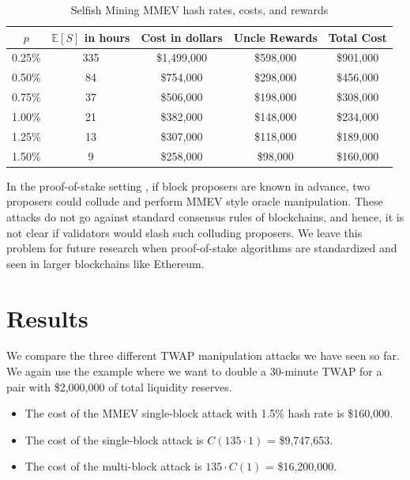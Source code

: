 \documentclass[conference]{IEEEtran}
\begin{document}
\begin{table}[h!]
\begin{center}
 \begin{tabular}{|c |c| c | c | c|} 
 \hline
 $p$ & $\mathbb{E}[S]$ in hours & Cost in dollars & Uncle Rewards & Total Cost\\ [0.5ex] 
 \hline
  0.25\% & 335& \$1,499,000 & \$598,000 &\$901,000\\
  \hline
  0.50\% & 84& \$754,000 & \$298,000 &\$456,000\\
  \hline
  0.75\% & 37& \$506,000 & \$198,000 &\$308,000\\
  \hline
  1.00\% & 21& \$382,000 & \$148,000 &\$234,000\\
  \hline
  1.25\% & 13& \$307,000 & \$118,000 &\$189,000\\
  \hline
  1.50\% & 9& \$258,000 & \$98,000 &\$160,000\\
  \hline
\end{tabular}
\end{center}
\caption{Selfish Mining MMEV hash rates, costs, and rewards}
\label{TableHittingTime}
\end{table}

In the proof-of-stake setting \cite{proof_of_stake}, if block proposers are known in advance, two proposers could collude and perform MMEV style oracle manipulation. These attacks do not go against standard consensus rules of blockchains, and hence, it is not clear if validators would slash such colluding proposers. We leave this problem for future research when proof-of-stake algorithms are standardized and seen in larger blockchains like Ethereum.

\section{Results}
We compare the three different TWAP manipulation attacks we have seen so far. We again use the example where we want to double a 30-minute TWAP for a pair with \$2,000,000 of total liquidity reserves. 

\begin{itemize}
    \item[] The cost of the MMEV single-block attack with 1.5\% hash rate is \$160,000.
    \item[] The cost of the single-block attack is $C(135 \cdot 1)$ = \$9,747,653.
    \item[] The cost of the multi-block attack is $135 \cdot C(1)$ = \$16,200,000.
\end{itemize}
 
\end{document}

